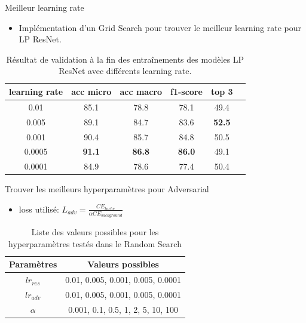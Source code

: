 \documentclass[11pt]{beamer}
\begin{document}
\begin{frame}{Meilleur learning rate}
    \begin{itemize}
        \item Implémentation d'un Grid Search pour trouver le meilleur learning rate pour LP ResNet.
    \end{itemize}
    \begin{table}[ht]
        \centering
        \begin{tabular}{cccccc}
        \toprule
        learning rate & acc micro & acc macro & f1-score & top 3 \\
        \midrule
        0.01 & 85.1 & 78.8 & 78.1 & 49.4 \\
        0.005 & 89.1 & 84.7 & 83.6 & \textbf{52.5} \\
        0.001 & 90.4 & 85.7 & 84.8 & 50.5 \\
        0.0005 & \textbf{91.1} & \textbf{86.8} & \textbf{86.0} & 49.1 \\
        0.0001 & 84.9 & 78.6 & 77.4 & 50.4 \\
        \bottomrule
        \end{tabular}
        \caption{Résultat de validation à la fin des entraînements des modèles LP ResNet avec différents learning rate.}
        \label{tab:gridsearch}
    \end{table}
\end{frame}

\begin{frame}{Trouver les meilleurs hyperparamètres pour Adversarial}
    \begin{itemize}
        \item loss utilisé: $L_{adv} = \frac{CE_{tache}}{\alpha CE_{background}}$
    \end{itemize}
    \begin{table}
        \centering
        \begin{tabular}{cc}
            \toprule
            Paramètres & Valeurs possibles\\
            \midrule
            $lr_{res}$ & 0.01, 0.005, 0.001, 0.005, 0.0001\\
            $lr_{adv}$ & 0.01, 0.005, 0.001, 0.005, 0.0001\\
            $\alpha$ & 0.001, 0.1, 0.5, 1, 2, 5, 10, 100\\
            \bottomrule
        \end{tabular}
        \caption{Liste des valeurs possibles pour les hyperparamètres testés dans le Random Search}
        \label{tab:random search possibilities}
    \end{table}
\end{frame}
\end{document}
